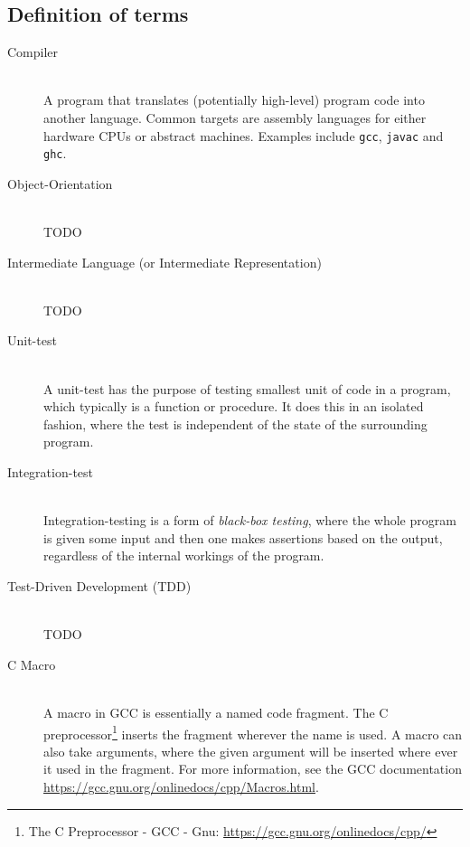 
\subsection{Definition of terms}
\begin{description}
\item[Compiler] \hfill \\
  A program that translates (potentially high-level) program code into
  another language. Common targets are assembly languages for either
  hardware CPUs or abstract machines. Examples include
  \texttt{gcc}\cite{NEEDED}, \texttt{javac}\cite{NEEDED} and
  \texttt{ghc}\cite{NEEDED}.

\item[Object-Orientation] \hfill \\
  TODO

\item[Intermediate Language (or Intermediate Representation)] \hfill \\
  TODO

\item[Unit-test] \hfill \\
  A unit-test has the purpose of testing smallest unit of code in a
  program, which typically is a function or procedure. It does this in
  an isolated fashion, where the test is independent of the state of
  the surrounding program.

\item[Integration-test] \hfill \\
  Integration-testing is a form of {\it black-box testing}, where the
  whole program is given some input and then one makes assertions
  based on the output, regardless of the internal workings of the
  program.

\item[Test-Driven Development (TDD)] \hfill \\
  TODO

\item[C Macro] \hfill \\
  A macro in GCC is essentially a named code fragment. The C
  preprocessor\footnote{The C Preprocessor - GCC - Gnu:
    \url{https://gcc.gnu.org/onlinedocs/cpp/}} inserts the fragment
  wherever the name is used. A macro can also take arguments, where
  the given argument will be inserted where ever it used in the
  fragment. For more information, see the GCC documentation
  \url{https://gcc.gnu.org/onlinedocs/cpp/Macros.html}.


\end{description}
